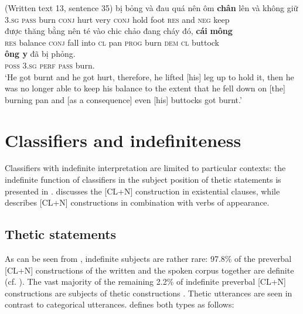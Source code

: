 \documentclass[output=paper]{langsci/langscibook}
\begin{document}
\begin{exe}
\ex\label{1ex:27}
(Written text 13, sentence 35)
\exi{}
  bị        bỏng  và         đau  quá   nên       ôm    {\textbf{chân}}  lên    và   không  giữ  \\
3.{\textsc{sg}}     {\textsc{pass}}  burn   {\textsc{conj}}  hurt  very  {\textsc{conj}}   hold  foot   {\textsc{res}}  and {\textsc{neg}}   keep \\
\glt
\exi{}
\gll được	 {thăng bằng}   nên      té   vào   chi{\dae}c chảo đang    cháy  đó,       {\textbf{cái}}   {\textbf{mông}} \\
{\textsc{res}}  balance          {\textsc{conj}}  fall into   {\textsc{cl}}    pan   {\textsc{prog}} burn   {\textsc{dem}}  {\textsc{cl}}  buttock \\
\exi{}
     {\textbf{ông {\daa}y}}  đã        bị        phỏng. \\
{\textsc{poss}} {\textsc{3.sg}}     {\textsc{perf}}  {\textsc{pass}}  burn.\\
\glt `He got burnt and he got hurt, therefore, he lifted [his] leg up to hold it, then he was no longer able to keep his balance to the extent that he fell down on [the] burning pan and [as a consequence] even [his] buttocks got burnt.'
\end{exe}


\section{Classifiers and indefiniteness}\label{sec:4}

Classifiers with indefinite interpretation are limited to particular contexts: the indefinite function of classifiers in the subject position of thetic statements is presented in .   discusses the [CL+N] construction in existential clauses, while  describes [CL+N] constructions in combination with verbs of appearance.

\subsection{Thetic statements}\label{1sec:41}

As can be seen from , indefinite subjects are rather rare: 97.8\% of the preverbal [CL+N] constructions of the written and the spoken corpus together are definite (cf. ). The vast majority of the remaining 2.2\% of indefinite preverbal [CL+N] constructions are subjects of thetic constructions \citep{kuroda:72,sasse:87,sasse:95}. Thetic utterances are seen in contrast to categorical utterances. \cite{sasse:95} defines both types as follows:\\
\end{document}
